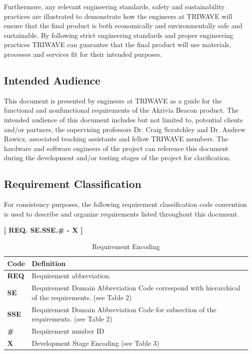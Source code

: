 Furthermore, any relevant engineering standards, safety and sustainability practices are illustrated to demonstrate how the engineers at TRIWAVE will ensure that the final product is both economically and environmentally safe and sustainable. By following strict engineering standards and proper engineering practices TRIWAVE can guarantee that the final product will use materials, processes and services fit for their intended purposes.

\bigskip
\subsection{Intended Audience}
This document is presented by engineers at TRIWAVE as a guide for the functional and nonfunctional requirements of the Akrivia Beacon product. The intended audience of this document includes but not limited to, potential clients and/or partners, the supervising professors Dr. Craig Scratchley and Dr. Andrew Rawicz, associated teaching assistants and fellow TRIWAVE members. The hardware and software engineers of the project can reference this document during the development and/or testing stages of the project for clarification.
\break



\subsection{Requirement Classification}
\bigskip
For consistency purposes, the following requirement classification code convention is used to describe and organize requirements listed throughout this document. 
\begin{center}
\bigskip
	\textbf{[ REQ. SE.SSE.\# - X ]} 
\end{center}

\bgroup
\def\arraystretch{1.5}
\begin{table}[H]
\centering
\begin{tabular}{ | m{1cm} | m{13cm}| } 
\hline
\rowcolor{lightgray} \textbf{Code} & \textbf{Definition} \\ 
\hline
 \textbf{REQ} & Requirement abbreviation.  \\ 
\hline
 \textbf{SE} & Requirement Domain Abbreviation Code correspond with hierarchical of the requirements. (see Table 2)\\ 
\hline
 \textbf{SSE} & Requirement Domain Abbreviation Code for subsection of the requirements. (see Table 2) \\  
\hline
 \textbf{\#} & Requirement number ID \\ 
\hline
 \textbf{X} & Development Stage Encoding (see Table 3)\\ 
\hline
\end{tabular}
\caption{Requirement Encoding}
\end{table}

